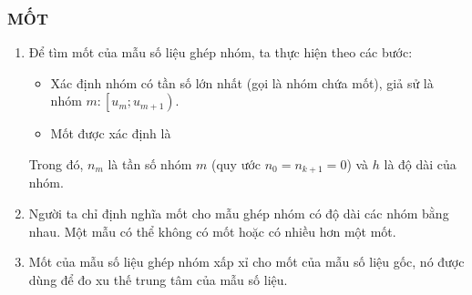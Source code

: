 	\subsubsection{MỐT}
\begin{enumerate}[\iconMT]
	\item {} Để tìm mốt của mẫu số liệu ghép nhóm, ta thực hiện theo các bước:
		\begin{itemize}
			\item {} Xác định nhóm có tần số lớn nhất (gọi là nhóm chứa mốt), giả sử là nhóm $m:\left[u_m;u_{m+1} \right)$.
			\item {} Mốt được xác định là 
		\end{itemize}
		Trong đó, $n_m$ là tần số nhóm $m$ (quy ước $n_0=n_{k+1}=0$) và $h$ là độ dài của nhóm.	
	\item {} Người ta chỉ định nghĩa mốt cho mẫu ghép nhóm có độ dài các nhóm bằng nhau. Một mẫu có thể không có mốt hoặc có nhiều hơn một mốt.	
	\item {} Mốt của mẫu số liệu ghép nhóm xấp xỉ cho mốt của mẫu số liệu gốc, nó được dùng để đo xu thế trung tâm của mẫu số liệu.
\end{enumerate}

